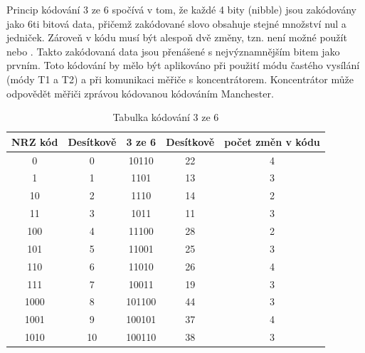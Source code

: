 Princip kódování 3 ze 6 spočívá v tom, že každé 4 bity (nibble) jsou zakódovány jako 6ti bitová data, přičemž zakódované slovo obsahuje stejné množství nul a jedniček. Zároveň v kódu musí být alespoň dvě změny, tzn. není možné použít  nebo . Takto zakódovaná data jsou přenášené s nejvýznamnějším bitem jako prvním. Toto kódování by mělo být aplikováno při použití módu častého vysílání (módy T1 a T2) a při komunikaci měřiče s koncentrátorem. Koncentrátor může odpovědět měřiči zprávou kódovanou kódováním Manchester.


\begin{table}[!ht]
\centering
\caption{Tabulka kódování 3 ze 6 \cite{WMencodeing}}
\begin{tabular}{|c|c|c|c|c|}
\hline
\textbf{NRZ kód} & \textbf{Desítkově} & \textbf{3 ze 6} & \textbf{Desítkově} & \textbf{počet změn v kódu} \\ \hline
0                & 0                  & 10110               & 22                 & 4                          \\ \hline
1                & 1                  & 1101                & 13                 & 3                          \\ \hline
10               & 2                  & 1110                & 14                 & 2                          \\ \hline
11               & 3                  & 1011                & 11                 & 3                          \\ \hline
100              & 4                  & 11100               & 28                 & 2                          \\ \hline
101              & 5                  & 11001               & 25                 & 3                          \\ \hline
110              & 6                  & 11010               & 26                 & 4                          \\ \hline
111              & 7                  & 10011               & 19                 & 3                          \\ \hline
1000             & 8                  & 101100              & 44                 & 3                          \\ \hline
1001             & 9                  & 100101              & 37                 & 4                          \\ \hline
1010             & 10                 & 100110              & 38                 & 3                          \\ \hline

\end{tabular}
\end{table}
